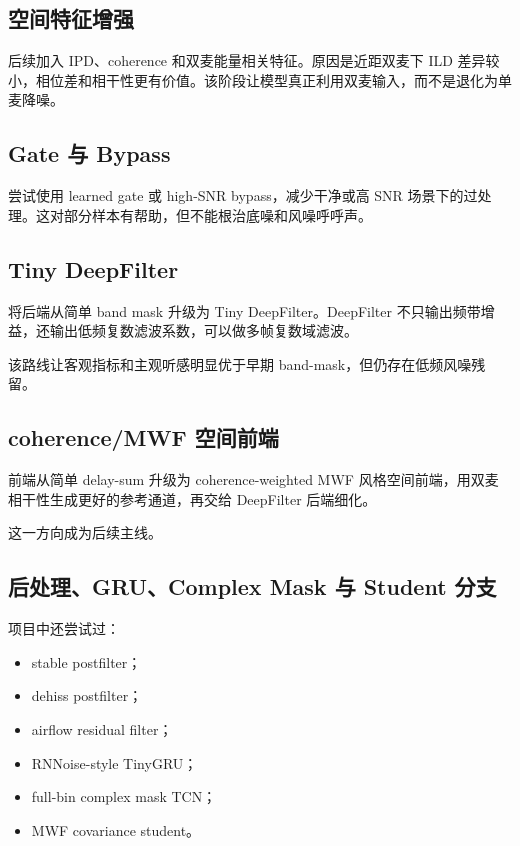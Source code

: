 \documentclass[UTF8,12pt,a4paper]{ctexart}
\begin{document}
\subsection{空间特征增强}

后续加入 IPD、coherence 和双麦能量相关特征。原因是近距双麦下 ILD 差异较小，相位差和相干性更有价值。该阶段让模型真正利用双麦输入，而不是退化为单麦降噪。

\subsection{Gate 与 Bypass}

尝试使用 learned gate 或 high-SNR bypass，减少干净或高 SNR 场景下的过处理。这对部分样本有帮助，但不能根治底噪和风噪呼呼声。

\subsection{Tiny DeepFilter}

将后端从简单 band mask 升级为 Tiny DeepFilter。DeepFilter 不只输出频带增益，还输出低频复数滤波系数，可以做多帧复数域滤波。

该路线让客观指标和主观听感明显优于早期 band-mask，但仍存在低频风噪残留。

\subsection{coherence/MWF 空间前端}

前端从简单 delay-sum 升级为 coherence-weighted MWF 风格空间前端，用双麦相干性生成更好的参考通道，再交给 DeepFilter 后端细化。

这一方向成为后续主线。

\subsection{后处理、GRU、Complex Mask 与 Student 分支}

项目中还尝试过：

\begin{itemize}
  \item stable postfilter；
  \item dehiss postfilter；
  \item airflow residual filter；
  \item RNNoise-style TinyGRU；
  \item full-bin complex mask TCN；
  \item MWF covariance student。
\end{itemize}
\end{document}
